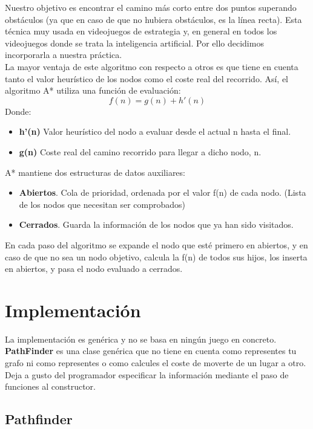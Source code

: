 \documentclass[a4paper,12pt,oneside]{book}
\begin{document}
Nuestro objetivo es encontrar el camino más corto entre dos puntos
superando obstáculos (ya que en caso de que no hubiera obstáculos, es la
línea recta). Esta técnica muy usada en videojuegos de
estrategia y, en general en todos los videojuegos donde se trata la
inteligencia artificial. Por ello decidimos incorporarla a nuestra práctica.\\

La mayor ventaja de este algoritmo con respecto a otros es que tiene
en cuenta tanto el valor heurístico de los nodos como el coste real del
recorrido. Así, el algoritmo A* utiliza una función de evaluación:
$$f(n) = g(n) + h'(n) $$
Donde:
\begin {itemize}
\item {\bf h'(n)} Valor heurístico del nodo a evaluar desde el actual n
  hasta el final.
\item {\bf g(n)} Coste real del camino recorrido para llegar a dicho nodo, n.
\end {itemize}


A* mantiene dos estructuras de datos auxiliares:
\begin {itemize}
\item {\bf Abiertos}. Cola de prioridad, ordenada por el valor f(n) de
  cada nodo. (Lista de los nodos que necesitan ser comprobados)
\item {\bf Cerrados}. Guarda la información de los nodos que ya han
  sido visitados.
\end {itemize}
En cada paso del algoritmo se expande el nodo que esté primero en
abiertos, y en caso de que no sea un nodo objetivo, calcula la f(n) de
todos sus hijos, los inserta en abiertos, y pasa el nodo evaluado a cerrados.



\section {Implementación}


La implementación es genérica y no se basa en ningún juego en
concreto. {\bf PathFinder} es una clase genérica que no tiene en
cuenta como representes tu grafo ni como representes o como calcules
el coste de moverte de un lugar a otro. Deja a gusto del programador
especificar la información mediante el paso de funciones al constructor.

\subsection{Pathfinder}
\end{document}
